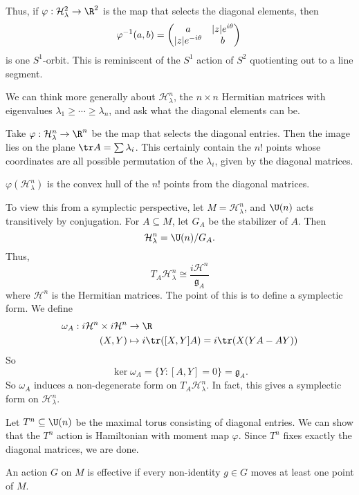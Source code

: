 \documentclass[a4paper]{article}
\begin{document}
\begin{eg}
  Thus, if $\varphi: \mathcal{H}_\lambda^2 \to \R^2$ is the map that selects the diagonal elements, then
  \[
    \varphi^{-1}(a, b) =
    \begin{pmatrix}
      a & |z|e^{i\theta}\\
      |z|e^{-i\theta} & b
    \end{pmatrix}\\
  \]
  is one $S^1$-orbit. This is reminiscent of the $S^1$ action of $S^2$ quotienting out to a line segment.
\end{eg}
We can think more generally about $\mathcal{H}_\lambda^n$, the $n\times n$ Hermitian matrices with eigenvalues $\lambda_1 \geq \cdots \geq \lambda_n$, and ask what the diagonal elements can be.

Take $\varphi: \mathcal{H}_\lambda^n \to \R^n$ be the map that selects the diagonal entries. Then the image lies on the plane $\tr A = \sum \lambda_i$. This certainly contain the $n!$ points whose coordinates are all possible permutation of the $\lambda_i$, given by the diagonal matrices.

\begin{thm}
  $\varphi(\mathcal{H}_\lambda^n)$ is the convex hull of the $n!$ points from the diagonal matrices.
\end{thm}

To view this from a symplectic perspective, let $M = \mathcal{H}_\lambda^n$, and $\U(n)$ acts transitively by conjugation. For $A \subseteq M$, let $G_A$ be the stabilizer of $A$. Then
\[
  \mathcal{H}_\lambda^n = \U(n)/G_A.
\]
Thus,
\[
  T_A \mathcal{H}_\lambda^n \cong \frac{i \mathcal{H}^n}{\mathfrak{g}_A}
\]
where $\mathcal{H}^n$ is the Hermitian matrices. The point of this is to define a symplectic form. We define
\begin{align*}
  \omega_A : i \mathcal{H}^n \times i \mathcal{H}^n &\to \R\\
  (X, Y) &\mapsto i\tr([X, Y]A) = i \tr (X (YA - AY))
\end{align*}
So
\[
  \ker \omega_A = \{Y : [A, Y] = 0\} = \mathfrak{g}_A.
\]
So $\omega_A$ induces a non-degenerate form on $T_A \mathcal{H}_\lambda^n$. In fact, this gives a symplectic form on $\mathcal{H}^n_\lambda$.

Let $T^n \subseteq \U(n)$ be the maximal torus consisting of diagonal entries. We can show that the $T^n$ action is Hamiltonian with moment map $\varphi$. Since $T^n$ fixes exactly the diagonal matrices, we are done.

\begin{defi}
  An action $G$ on $M$ is effective if every non-identity $g \in G$ moves at least one point of $M$. %
\end{defi}
\end{document}
